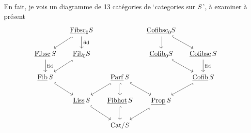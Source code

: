 \documentclass[11pt]{article}
\newcommand{\ul}[1]{\underline{\mathrm{#1}}}
\begin{document}
En fait, je vois un diagramme de 13 catégories de `categories sur $S$\,', à examiner à présent %
\[
\begin{tikzcd}[column sep=small]
 & \ul{Fibsc}_0S \arrow[dl, hook] \arrow[d, "\mathrm{fid}"] & & \ul{Cofibsc}_0S \arrow[d] \arrow[dr, hook] & \\
\ul{Fibsc}\,S \arrow[d, "\mathrm{fid}"] & \ul{Fib}_0S \arrow[dl, hook] & & \ul{Cofib}_0S \arrow[dr, hook] & \ul{Cofibsc}\,S \arrow[d, "\mathrm{fid}"] \\
\ul{Fib}\,S \arrow[dr, hook] & & \ul{Parf}\,S \arrow[dl, hook] \arrow[d, hook] \arrow[dr, hook] & & \ul{Cofib}\,S \arrow[dl, hook] \\
 & \ul{Liss}\,S \arrow[dr, hook] & \ul{Fibhot}\,S \arrow[d, hook] & \ul{Prop}\,S \arrow[dl, hook] & \\
 & & \mathrm{Cat}/S & &
\end{tikzcd}
\]
\end{document}
